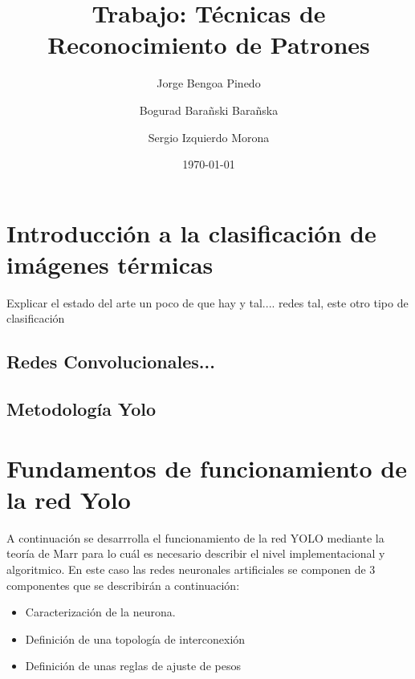 \documentclass{article}
\title{Trabajo: Técnicas de Reconocimiento de Patrones}
\author{Jorge Bengoa Pinedo \and Bogurad Barañski Barañska \and Sergio Izquierdo Morona }
\date{\today}
\begin{document}
	
	\maketitle
	
	\tableofcontents
	\newpage

	\section{Introducción a la clasificación de imágenes térmicas}
	Explicar el estado del arte un poco de que hay y tal.... redes tal, este otro tipo de clasificación
	\subsection{Redes Convolucionales...}
	\subsection{Metodología Yolo}
	
	\section{Fundamentos de funcionamiento de la red Yolo}
	A continuación se desarrrolla el funcionamiento de la red YOLO mediante la teoría de Marr para lo cuál es necesario describir el nivel implementacional y algoritmico. En este caso las redes neuronales artificiales se componen de 3 componentes que se describirán a continuación:
	\begin{itemize}
		\item Caracterización de la neurona.
		\item Definición de una topología de interconexión
		\item Definición de unas reglas de ajuste de pesos
	\end{itemize}
	
\end{document}
